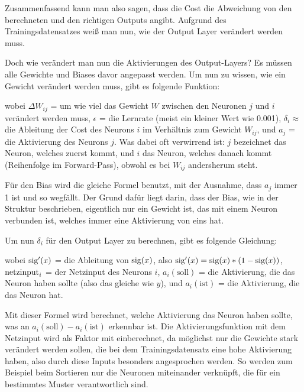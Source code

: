 \documentclass[10pt]{scrartcl}
\begin{document}
	Zusammenfassend kann man also sagen, dass die Cost die Abweichung von den berechneten und den richtigen Outputs angibt. Aufgrund des Trainingsdatensatzes weiß man nun, wie der Output Layer verändert werden
	muss.


	Doch wie verändert man nun die Aktivierungen des Output-Layers? Es müssen alle Gewichte und Biases davor angepasst werden. Um nun zu wissen, wie ein Gewicht verändert werden muss, gibt es folgende Funktion:

	\form{\[
		\Delta W_{ij} = \epsilon * \delta_i * a_j
	\]}

	wobei $\Delta W_{ij}$ = um wie viel das Gewicht $W$ zwischen den Neuronen $j$ und $i$ verändert werden muss, $\epsilon$ = die Lernrate (meist ein kleiner Wert wie 0.001), $\delta_i \approx$ die Ableitung der Cost des Neurons $i$ im Verhältnis zum Gewicht $W_{ij}$, und $a_j$ = die Aktivierung des Neurons $j$. Was dabei oft verwirrend ist: $j$ bezeichnet das Neuron, welches zuerst kommt, und $i$ das Neuron, welches danach kommt (Reihenfolge im Forward-Pass), obwohl es bei $W_{ij}$ andersherum steht.

	Für den Bias wird die gleiche Formel benutzt, mit der Ausnahme, dass $a_j$ immer 1 ist und so wegfällt. Der Grund dafür liegt darin, dass der Bias, wie in der Struktur beschrieben, eigentlich nur ein Gewicht ist, das mit einem Neuron verbunden ist, welches immer eine Aktivierung von eins hat.

	Um nun $\delta_i$ für den Output Layer zu berechnen, gibt es folgende Gleichung: 

	\form{\[
		\delta_i = \sig '\left({\netin}_i\right) * (a_i (\textrm{soll}) - a_i (\textrm{ist})) 
	\]}

	wobei $\textrm{sig} '(x)$ = die Ableitung von $\textrm{sig}(x)$, also $\textrm{sig}'(x) = \textrm{sig}(x) * (1 - \textrm{sig}(x))$, $\textrm{netzinput}_i$ = der Netzinput des Neurons $i$, $a_i(\textrm{soll})$ = die Aktivierung, die das Neuron haben sollte (also das gleiche wie $y$), und $a_i(\textrm{ist})$ = die Aktivierung, die das Neuron hat.

	Mit dieser Formel wird berechnet, welche Aktivierung das Neuron haben sollte, was an $a_i(\textrm{soll}) - a_i(\textrm{ist})$ erkennbar ist. Die Aktivierungsfunktion mit dem Netzinput wird als Faktor mit einberechnet, da möglichst nur die Gewichte stark verändert werden sollen, die bei dem Trainingsdatensatz eine hohe Aktivierung haben, also durch diese Inputs besonders angesprochen werden. So werden zum Beispiel beim Sortieren nur die Neuronen miteinander verknüpft, die für ein bestimmtes Muster verantwortlich sind.
	
\end{document}
